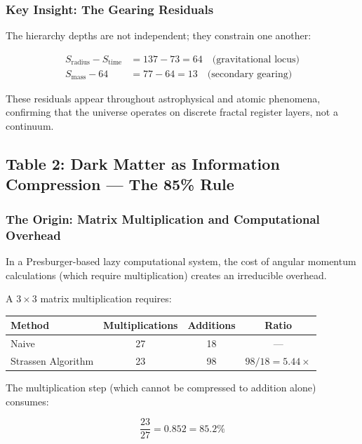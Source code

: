 \documentclass[11pt,a4paper]{article}
\begin{document}
\subsubsection{Key Insight: The Gearing Residuals}

The hierarchy depths are not independent; they constrain one another:

\begin{align}
S_{\mathrm{radius}} - S_{\mathrm{time}} &= 137 - 73 = 64 \quad \text{(gravitational locus)} \label{eq:residual1} \\
S_{\mathrm{mass}} - 64 &= 77 - 64 = 13 \quad \text{(secondary gearing)} \label{eq:residual2}
\end{align}

These residuals appear throughout astrophysical and atomic phenomena, confirming that the universe operates on discrete fractal register layers, not a continuum.


\subsection{Table 2: Dark Matter as Information Compression --- The 85\% Rule}

\subsubsection{The Origin: Matrix Multiplication and Computational Overhead}

In a Presburger-based lazy computational system, the cost of angular momentum calculations (which require multiplication) creates an irreducible overhead.

A $3 \times 3$ matrix multiplication requires:

\begin{table}[h]
\centering
\begin{tabular}{|l|c|c|c|}
\hline
\textbf{Method} & \textbf{Multiplications} & \textbf{Additions} & \textbf{Ratio} \\
\hline
Naive & 27 & 18 & — \\
\hline
Strassen Algorithm & 23 & 98 & $98/18 = 5.44\times$ \\
\hline
\end{tabular}
\end{table}

The multiplication step (which cannot be compressed to addition alone) consumes:

\begin{equation}
\frac{23}{27} = 0.852 = \boxed{85.2\%}
\end{equation}
\end{document}
